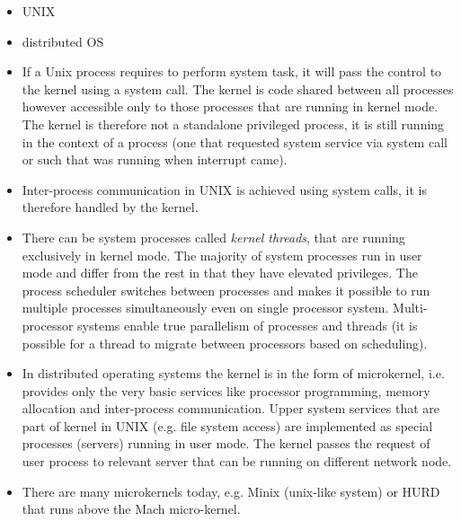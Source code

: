 
\begin{slide}
\begin{itemize}
\item UNIX\vspace{1ex}


\item distributed OS\vspace{1ex}


\end{itemize}
\end{slide}

\begin{itemize}
\item If a Unix process requires to perform system task, it will pass the
control to the kernel using a system call. The kernel is code shared between
all processes however accessible only to those processes that are running in
kernel mode. The kernel is therefore not a standalone privileged process,
it is still running in the context of a process (one that requested system
service via system call or such that was running when interrupt came).
\item Inter-process communication in UNIX is achieved using system calls,
it is therefore handled by the kernel.
\item There can be system processes called \emph{kernel threads}, that are
running exclusively in kernel mode. The majority of system processes run in user
mode and differ from the rest in that they have elevated privileges.
The process scheduler switches between processes and makes it possible to run
multiple processes simultaneously even on single processor system.
Multi-processor systems enable true parallelism of processes and threads
(it is possible for a thread to migrate between processors based on scheduling).
\item In distributed operating systems the kernel is in the form of microkernel,
i.e. provides only the very basic services like processor programming, memory
allocation and inter-process communication. Upper system services that are part
of kernel in UNIX (e.g. file system access) are implemented as special processes
(servers) running in user mode. The kernel passes the request of user process to
relevant server that can be running on different network node.
\item There are many microkernels today, e.g. Minix (unix-like system) or HURD
that runs above the Mach micro-kernel.
\end{itemize}

